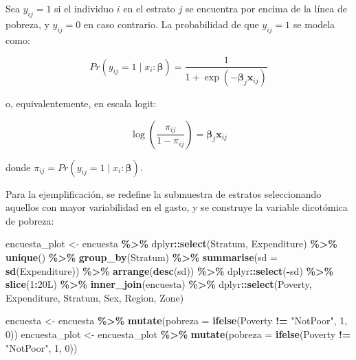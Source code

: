 \documentclass[
  spanish,
  12pt,
]{book}
\newenvironment{Shaded}{\begin{snugshade}}{\end{snugshade}}
\newcommand{\AttributeTok}[1]{\textcolor[rgb]{0.13,0.29,0.53}{#1}}
\newcommand{\DataTypeTok}[1]{\textcolor[rgb]{0.13,0.29,0.53}{#1}}
\newcommand{\DecValTok}[1]{\textcolor[rgb]{0.00,0.00,0.81}{#1}}
\newcommand{\FunctionTok}[1]{\textcolor[rgb]{0.13,0.29,0.53}{\textbf{#1}}}
\newcommand{\NormalTok}[1]{#1}
\newcommand{\OtherTok}[1]{\textcolor[rgb]{0.56,0.35,0.01}{#1}}
\newcommand{\SpecialCharTok}[1]{\textcolor[rgb]{0.81,0.36,0.00}{\textbf{#1}}}
\newcommand{\StringTok}[1]{\textcolor[rgb]{0.31,0.60,0.02}{#1}}
\begin{document}
Sea \(y_{ij} = 1\) si el individuo \(i\) en el estrato \(j\) se encuentra por encima de la línea de pobreza, y \(y_{ij} = 0\) en caso contrario. La probabilidad de que \(y_{ij} = 1\) se modela como:

\[
Pr\left(y_{ij} = 1 \mid x_i : \boldsymbol{\beta}\right) = \frac{1}{1 + \exp\left(-\boldsymbol{\beta}_j \boldsymbol{x}_{ij}\right)}
\]

o, equivalentemente, en escala logit:

\[
\log\left(\frac{\pi_{ij}}{1 - \pi_{ij}}\right) = \boldsymbol{\beta}_j \boldsymbol{x}_{ij}
\]

donde \(\pi_{ij} = Pr\left(y_{ij} = 1 \mid x_i : \boldsymbol{\beta}\right)\).

Para la ejemplificación, se redefine la submuestra de estratos seleccionando aquellos con mayor variabilidad en el gasto, y se construye la variable dicotómica de pobreza:

\begin{Shaded}
\begin{Highlighting}[]
\NormalTok{encuesta\_plot }\OtherTok{\textless{}{-}}\NormalTok{ encuesta }\SpecialCharTok{\%\textgreater{}\%}
\NormalTok{  dplyr}\SpecialCharTok{::}\FunctionTok{select}\NormalTok{(Stratum, Expenditure) }\SpecialCharTok{\%\textgreater{}\%}
  \FunctionTok{unique}\NormalTok{() }\SpecialCharTok{\%\textgreater{}\%}
  \FunctionTok{group\_by}\NormalTok{(Stratum) }\SpecialCharTok{\%\textgreater{}\%}
  \FunctionTok{summarise}\NormalTok{(}\AttributeTok{sd =} \FunctionTok{sd}\NormalTok{(Expenditure)) }\SpecialCharTok{\%\textgreater{}\%}
  \FunctionTok{arrange}\NormalTok{(}\FunctionTok{desc}\NormalTok{(sd)) }\SpecialCharTok{\%\textgreater{}\%}
\NormalTok{  dplyr}\SpecialCharTok{::}\FunctionTok{select}\NormalTok{(}\SpecialCharTok{{-}}\NormalTok{sd) }\SpecialCharTok{\%\textgreater{}\%}
  \FunctionTok{slice}\NormalTok{(}\DecValTok{1}\SpecialCharTok{:}\DecValTok{20}\DataTypeTok{L}\NormalTok{) }\SpecialCharTok{\%\textgreater{}\%}
  \FunctionTok{inner\_join}\NormalTok{(encuesta) }\SpecialCharTok{\%\textgreater{}\%}
\NormalTok{  dplyr}\SpecialCharTok{::}\FunctionTok{select}\NormalTok{(Poverty, Expenditure, Stratum, Sex, Region, Zone)}

\NormalTok{encuesta      }\OtherTok{\textless{}{-}}\NormalTok{ encuesta }\SpecialCharTok{\%\textgreater{}\%} \FunctionTok{mutate}\NormalTok{(}\AttributeTok{pobreza =} \FunctionTok{ifelse}\NormalTok{(Poverty }\SpecialCharTok{!=} \StringTok{"NotPoor"}\NormalTok{, }\DecValTok{1}\NormalTok{, }\DecValTok{0}\NormalTok{))}
\NormalTok{encuesta\_plot }\OtherTok{\textless{}{-}}\NormalTok{ encuesta\_plot }\SpecialCharTok{\%\textgreater{}\%} \FunctionTok{mutate}\NormalTok{(}\AttributeTok{pobreza =} \FunctionTok{ifelse}\NormalTok{(Poverty }\SpecialCharTok{!=} \StringTok{"NotPoor"}\NormalTok{, }\DecValTok{1}\NormalTok{, }\DecValTok{0}\NormalTok{))}
\end{Highlighting}
\end{Shaded}
\end{document}
